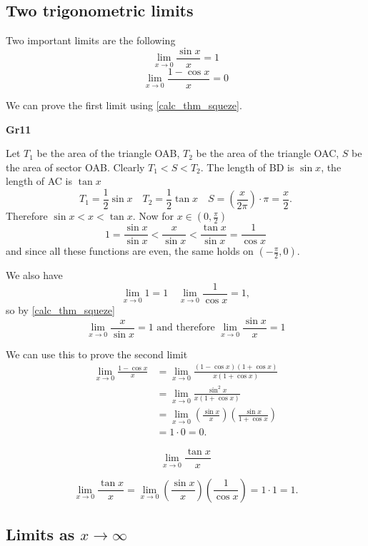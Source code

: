\documentclass[10pt, a4paper]{article}
\begin{document}
\subsection{Two trigonometric limits}
Two important limits are the following
\[
\lim_{x \rightarrow 0}\frac{\sin x}{x} = 1
\]
\[
\lim_{x \rightarrow 0}\frac{1 - \cos x}{x} = 0
\]

We can prove the first limit using \autoref{calc_thm_squeze}.

\textbf{Gr11}

Let $T_1$ be the area of the triangle OAB, $T_2$ be the area of the triangle OAC, $S$ be the area of sector OAB. Clearly $T_1 < S < T_2$. The length of BD is $\sin x$, the length of AC is $\tan x$
\[
T_1 = \frac{1}{2}\sin x\quad T_2 = \frac{1}{2}\tan x\quad S = \left(\frac{x}{2\pi}\right) \cdot \pi = \frac{x}{2}.
\]
Therefore $\sin x < x < \tan x$. Now for $x \in \left(0, \frac{\pi}{2}\right)$
\[
1 = \frac{\sin x}{\sin x} < \frac{x}{\sin x} < \frac{\tan x}{\sin x} = \frac{1}{\cos x}
\]
and since all these functions are even, the same holds on $\left(-\frac{\pi}{2}, 0\right)$.

We also have
\[
\lim_{x \rightarrow 0} 1 = 1\quad\lim_{x \rightarrow 0}\frac{1}{\cos x} = 1,
\]
so by \autoref{calc_thm_squeze}
\[
\lim_{x \rightarrow 0}\frac{x}{\sin x} = 1\text{ and therefore } \lim_{x \rightarrow 0}\frac{\sin x}{x} = 1
\]

We can use this to prove the second limit
\begin{align*}
\lim_{x \rightarrow 0}\frac{1 - \cos x}{x} &= \lim_{x \rightarrow 0}\frac{(1 - \cos x)(1 + \cos x)}{x(1 + \cos x)} \\ 
&= \lim_{x \rightarrow 0}\frac{\sin ^ 2 x}{x(1 + \cos x)} \\
&= \lim_{x \rightarrow 0}\left(\frac{\sin x}{x}\right)\left(\frac{\sin x}{1 + \cos x}\right) \\
&= 1 \cdot 0 = 0.
\end{align*}

\begin{example}
    \[
    \lim_{x \rightarrow 0}\frac{\tan x}{x}
    \]

    \[
    \lim_{x \rightarrow 0}\frac{\tan x}{x} = \lim_{x \rightarrow 0} \left(\frac{\sin x}{x}\right) \left(\frac{1}{\cos x}\right) = 1 \cdot 1 = 1.
    \]
\end{example}


\subsection{Limits as \texorpdfstring{$x \rightarrow \infty$}{x tends to infinity}}
\end{document}
